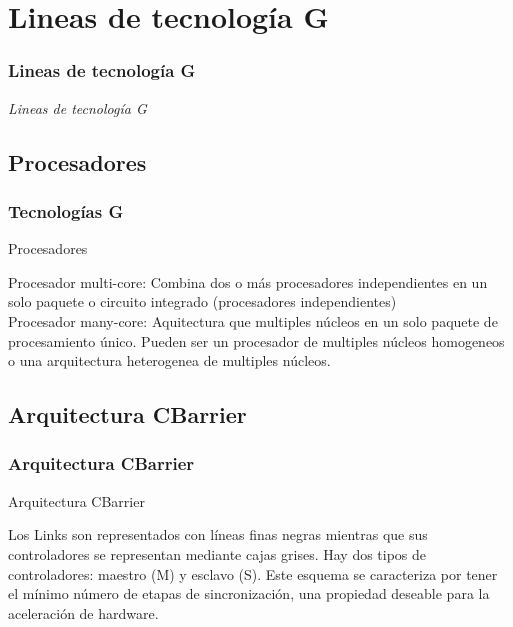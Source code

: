 \documentclass[11pt]{beamer}					%
\begin{document}
			
\section{Lineas de tecnología G}	
		 \begin{frame}[fragile]
			\frametitle{Lineas de tecnología G}
			\begin{huge}
			\begin{center}
				\emph{\textit{Lineas de tecnología G}}
			\end{center}
			\end{huge}
		\end{frame}		
		   		
    		\subsection{Procesadores}			
			\begin{frame}[fragile]
		\frametitle{Tecnologías G}
			
			\begin{block}{Procesadores}
			
			
Procesador multi-core: Combina dos o más procesadores independientes en un solo paquete o circuito integrado (procesadores independientes)\\
Procesador many-core: Aquitectura que multiples núcleos en un solo paquete de procesamiento único. Pueden ser un procesador de multiples núcleos homogeneos o una arquitectura heterogenea de multiples núcleos.

				\end{block}
				
	
			\end{frame}
			
			\subsection{Arquitectura CBarrier}			
			\begin{frame}[fragile]
		\frametitle{Arquitectura CBarrier}
			
			\begin{block}{Arquitectura CBarrier}
			
			
Los Links
son representados con líneas finas negras mientras
que sus controladores se representan mediante cajas
grises. Hay dos tipos de controladores: maestro (M)
y esclavo (S). Este esquema se caracteriza por tener
el mínimo número de etapas de sincronización, una
propiedad deseable para la aceleración de hardware.

				\end{block}
				
	
			\end{frame}
			
\end{document}

